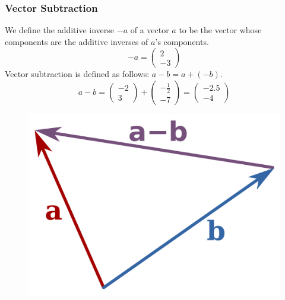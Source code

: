 \documentclass[xcolor=dvipsnames]{beamer}
\begin{document}
\begin{frame}
  \frametitle{Vector Subtraction}
We define the additive inverse $-a$ of a vector $a$ to be the vector
whose components are the additive inverses of $a$'s components.
\begin{equation}
  \label{eq:yaivujoh}
  -a=\left(
    \begin{array}{c}
      2 \\
      -3
    \end{array}\right)
\end{equation}
Vector subtraction is defined as follows: $a-b=a+(-b)$. 
\begin{equation}
  \label{eq:ahkeizoh}
  a-b=\left(
    \begin{array}{c}
      -2 \\
      3
    \end{array}\right)+\left(
    \begin{array}{c}
      -\frac{1}{2} \\
      -7
    \end{array}\right)=\left(
    \begin{array}{c}
      -2.5 \\
      -4
    \end{array}\right)
\end{equation}
  \begin{figure}[h]
    \includegraphics[scale=.07]{./vectorminus.png}
  \end{figure}
\end{frame}
\end{document}

